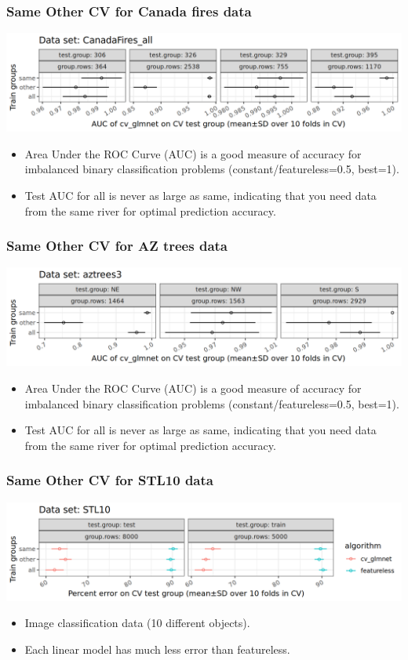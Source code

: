\documentclass{beamer}
\begin{document}
\begin{frame}
  \frametitle{Same Other CV for Canada fires data}
  \includegraphics[width=\textwidth]{CanadaFires_all_AUC_glmnet_mean_SD.png}
  \begin{itemize}
  \item Area Under the ROC Curve (AUC) is a good measure of accuracy
    for imbalanced binary classification problems (constant/featureless=0.5, best=1).
  \item Test AUC for all is never as large as same, indicating that
    you need data from the same river for optimal prediction accuracy.
  \end{itemize}
\end{frame}

\begin{frame}
  \frametitle{Same Other CV for AZ trees data}
  \includegraphics[width=\textwidth]{AZtrees3_AUC_glmnet_mean_SD.png}
  \begin{itemize}
  \item Area Under the ROC Curve (AUC) is a good measure of accuracy
    for imbalanced binary classification problems (constant/featureless=0.5, best=1).
  \item Test AUC for all is never as large as same, indicating that
    you need data from the same river for optimal prediction accuracy.
  \end{itemize}
\end{frame}

\begin{frame}[fragile]
  \frametitle{Same Other CV for STL10 data}
  \includegraphics[width=\textwidth]{STL10_error_glmnet_featureless_mean_SD.png}
  \begin{itemize}
  \item Image classification data (10 different objects).
  \item Each linear model has much less error than featureless.
  \end{itemize}
\end{frame}
\end{document}
